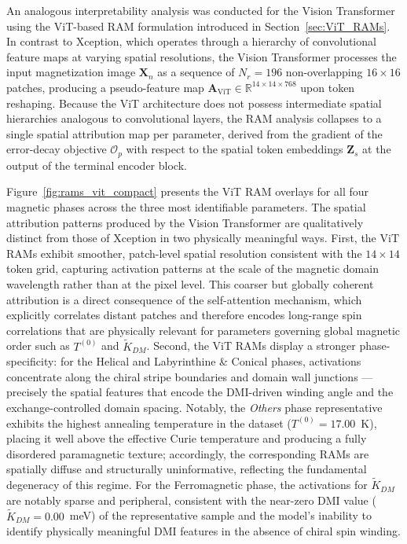\documentclass[final,5p,times,twocolumn]{elsarticle}
\begin{document}

An analogous interpretability analysis was conducted for
the Vision Transformer using the ViT-based RAM formulation
introduced in Section~\ref{sec:ViT_RAMs}. In contrast
to Xception, which operates through a hierarchy of
convolutional feature maps at varying spatial resolutions,
the Vision Transformer processes the input magnetization
image $\mathbf{X}_n$ as a sequence of $N_r = 196$
non-overlapping $16\times16$ patches, producing a
pseudo-feature map $\mathbf{A}_{\text{ViT}} \in
\mathbb{R}^{14\times14\times768}$ upon token reshaping.
Because the ViT architecture does not possess intermediate
spatial hierarchies analogous to convolutional layers, the
RAM analysis collapses to a single spatial attribution map
per parameter, derived from the gradient of the
error-decay objective $\mathcal{O}_p$ with respect to the
spatial token embeddings $\mathbf{Z}_s$ at the output of
the terminal encoder block.

Figure~\ref{fig:rams_vit_compact} presents the ViT RAM
overlays for all four magnetic phases across the three
most identifiable parameters. The spatial attribution
patterns produced by the Vision Transformer are
qualitatively distinct from those of Xception in two
physically meaningful ways. First, the ViT RAMs exhibit
smoother, patch-level spatial resolution consistent with
the $14\times14$ token grid, capturing activation patterns
at the scale of the magnetic domain wavelength rather
than at the pixel level. This coarser but globally
coherent attribution is a direct consequence of the
self-attention mechanism, which explicitly correlates
distant patches and therefore encodes long-range spin
correlations that are physically relevant for parameters
governing global magnetic order such as $T^{(0)}$ and
$\tilde{K}_{DM}$. Second, the ViT RAMs display a
stronger phase-specificity: for the Helical and
Labyrinthine \& Conical phases, activations concentrate
along the chiral stripe boundaries and domain wall
junctions --- precisely the spatial features that encode
the DMI-driven winding angle and the exchange-controlled
domain spacing. Notably, the \textit{Others} phase
representative exhibits the highest annealing temperature
in the dataset ($T^{(0)} = 17.00$~K), placing it well
above the effective Curie temperature and producing a
fully disordered paramagnetic texture; accordingly, the
corresponding RAMs are spatially diffuse and structurally
uninformative, reflecting the fundamental degeneracy of
this regime. For the Ferromagnetic phase, the activations
for $\tilde{K}_{DM}$ are notably sparse and peripheral,
consistent with the near-zero DMI value ($\tilde{K}_{DM}
= 0.00$~meV) of the representative sample and the
model's inability to identify physically meaningful DMI
features in the absence of chiral spin winding.
\end{document}
